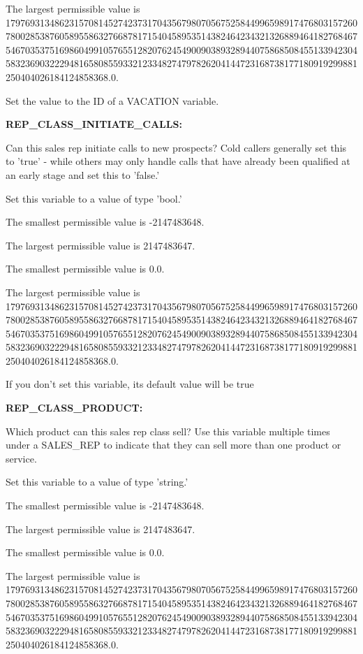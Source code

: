 The largest permissible value is 179769313486231570814527423731704356798070567525844996598917476803157260780028538760589558632766878171540458953514382464234321326889464182768467546703537516986049910576551282076245490090389328944075868508455133942304583236903222948165808559332123348274797826204144723168738177180919299881250404026184124858368.0.

Set the value to the ID of a VACATION variable.


\textbf{REP\_CLASS\_INITIATE\_CALLS:}


Can this sales rep initiate calls to new prospects?  Cold callers generally set this to 'true' - while others may only handle calls that have already been qualified at an early stage and set this to 'false.'

Set this variable to a value of type 'bool.'

The smallest permissible value is -2147483648.

The largest permissible value is 2147483647.

The smallest permissible value is 0.0.

The largest permissible value is 179769313486231570814527423731704356798070567525844996598917476803157260780028538760589558632766878171540458953514382464234321326889464182768467546703537516986049910576551282076245490090389328944075868508455133942304583236903222948165808559332123348274797826204144723168738177180919299881250404026184124858368.0.

If you don't set this variable, its default value will be true


\textbf{REP\_CLASS\_PRODUCT:}


Which product can this sales rep class sell?  Use this variable multiple times under a SALES\_REP to indicate that they can sell more than one product or service.

Set this variable to a value of type 'string.'

The smallest permissible value is -2147483648.

The largest permissible value is 2147483647.

The smallest permissible value is 0.0.

The largest permissible value is 179769313486231570814527423731704356798070567525844996598917476803157260780028538760589558632766878171540458953514382464234321326889464182768467546703537516986049910576551282076245490090389328944075868508455133942304583236903222948165808559332123348274797826204144723168738177180919299881250404026184124858368.0.

